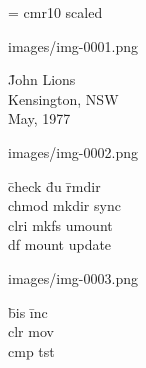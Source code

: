 \scrollmode
{} \font \twlrm = cmr10 scaled 

\setlength{\textwidth }{16.6cm} \setlength{\oddsidemargin }{-0.25cm} \setlength{\evensidemargin }{-0.25cm} \setlength{\textheight }{24.1cm} \setlength{\topmargin }{-1.3cm} \setlength{\columnsep }{1cm} 

\makeatletter\oddsidemargin -0.25in\evensidemargin -0.25in


\begin{plasTeXimage}{images/img-0001.png}
\begin{tabbing} \hspace{5cm} \=  John Lions \\ \>  Kensington, NSW \\ \>  May, 1977 \\ \end{tabbing}
\end{plasTeXimage}

\begin{plasTeXimage}{images/img-0002.png}
\begin{tabbing} \hspace{1cm} \=  check \hspace{1cm} \=  du \hspace{1.5cm} \=  rmdir \\ \>  chmod \>  mkdir \>  sync \\ \>  clri \>  mkfs \>  umount \\ \>  df \>  mount \>  update \\ \end{tabbing}
\end{plasTeXimage}

\begin{plasTeXimage}{images/img-0003.png}
\begin{tabbing} \hspace{2cm} \=  bis \hspace{2cm} \=  inc \\ \>  clr \>  mov \\ \>  cmp \>  tst \\ \end{tabbing}
\end{plasTeXimage}

